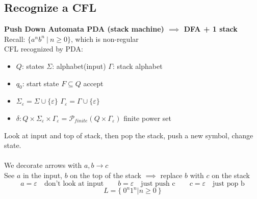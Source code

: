 \documentclass[11pt]{article}
\begin{document}
\subsection*{Recognize a CFL}
\textbf{Push Down Automata \quad PDA \quad (stack machine) $\implies$  DFA + 1 stack} \\
Recall: $\{ a^n b^n\ |\ n \geq 0 \}$, which is non-regular\\
CFL recognized by PDA:\\
\begin{itemize}
	\item $Q$: states \quad $\Sigma$: alphabet(input) \quad $\Gamma$: stack alphabet 
	\item $q_0$: start state \quad $F \subseteq Q$ accept 
	\item $\Sigma_\varepsilon = \Sigma \cup \{ \varepsilon \}$ \quad $\Gamma_{\varepsilon} = \Gamma\cup \{ \varepsilon \}$
	\item $\delta: Q \times \Sigma_{\varepsilon} \times \Gamma_{\varepsilon} = \mathcal{P}_{finite}(Q \times \Gamma_{\varepsilon} )$ \quad \quad finite power set
\end{itemize}
Look at input and top of stack, then pop the stack, push a new symbol, change state.\\
\\
We decorate arrows with $a, b \to c$\\
See $a$ in the input, $b$ on the top of the stack $\implies$ replace $b$ with $c$ on the stack
$$ a = \varepsilon \quad \text{don't look at input} \quad \quad b = \varepsilon \quad \text{just push c}\quad \quad c = \varepsilon \quad \text{just pop b} $$
\newpage
$$ L = \{\ 0^n 1^n | n \geq 0\ \} $$
\end{document}
